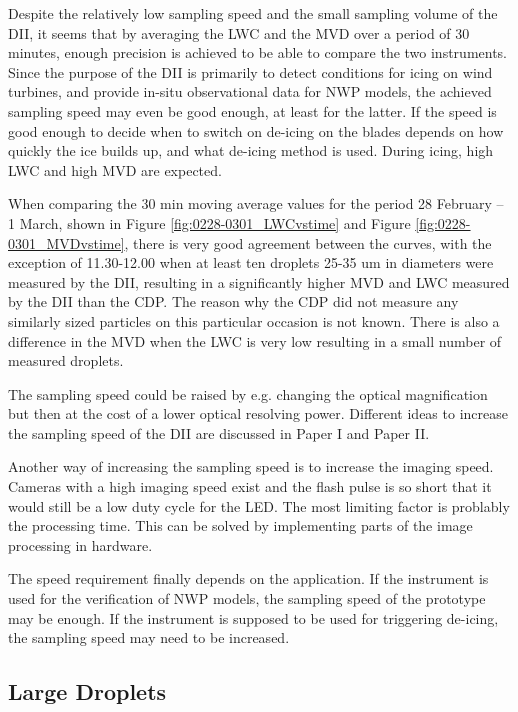 Despite the relatively low sampling speed and the small sampling volume of the DII, it seems that by averaging the LWC and the MVD over a period of 30 minutes, enough precision is achieved to be able to compare the two instruments. Since the purpose of the DII is primarily to detect conditions for icing on wind turbines, and provide in-situ observational data for NWP models, the achieved sampling speed may even be good enough, at least for the latter. If the speed is good enough to decide when to switch on de-icing on the blades depends on how quickly the ice builds up, and what de-icing method is used. During icing, high LWC and high MVD are expected.

When comparing the 30 min moving average values for the period 28 February -- 1 March, shown in Figure \ref{fig:0228-0301_LWCvstime} and Figure \ref{fig:0228-0301_MVDvstime}, there is very good agreement between the curves, with the exception of 11.30-12.00 when at least ten droplets 25-35 um in diameters were measured by the DII, resulting in a significantly higher MVD and LWC measured by the DII than the CDP. The reason why the CDP did not measure any similarly sized particles on this particular occasion is not known. There is also a difference in the MVD when the LWC is very low resulting in a small number of measured droplets.

The sampling speed could be raised by e.g. changing the optical magnification but then at the cost of a lower optical resolving power. Different ideas to increase the sampling speed of the DII are discussed in Paper I and Paper II.

Another way of increasing the sampling speed is to increase the imaging speed. Cameras with a high imaging speed exist and the flash pulse is so short that it would still be a low duty cycle for the LED. The most limiting factor is problably the processing time. This can be solved by implementing parts of the image processing in hardware.

The speed requirement finally depends on the application. If the instrument is used for the verification of NWP models, the sampling speed of the prototype may be enough. If the instrument is supposed to be used for triggering de-icing, the sampling speed may need to be increased.

\subsection{Large Droplets}

